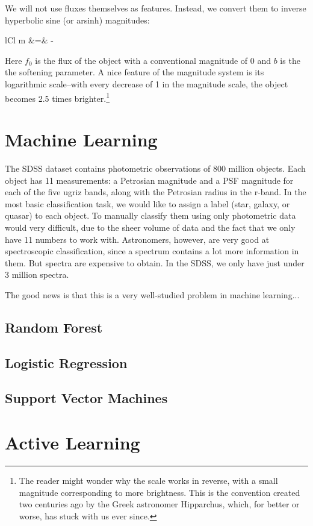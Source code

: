 We will not use fluxes themselves as features. Instead, we convert them to inverse
hyperbolic sine (or arsinh) magnitudes:
	\begin{IEEEeqnarray*}{lCl}
		m &=& - 
	\end{IEEEeqnarray*}
Here $f_0$ is the flux of the object with a conventional magnitude of 0 and $b$ is the
the softening parameter. A nice feature of the magnitude system is its logarithmic scale--with
every decrease of 1 in the magnitude scale, the object becomes 2.5 times brighter.\footnote{
	The reader might wonder why the scale works in reverse, with a small magnitude
	corresponding to more brightness. This is the convention created two centuries ago by
	the Greek astronomer Hipparchus, which, for better or worse, has stuck with us ever since.}



\section{Machine Learning}
\label{sec:machine}

The SDSS dataset contains photometric observations of 800 million objects. Each object
has 11 measurements: a Petrosian magnitude and a PSF magnitude for each of the five
ugriz bands, along with the Petrosian radius in the r-band. In the most basic
classification task, we would like to assign a label (star, galaxy, or quasar) to each object.
To manually classify them using only photometric data would very difficult, due to the 
sheer volume of data and the fact that we only have 11 numbers to work with. Astronomers, however,
are very good at spectroscopic classification, since a spectrum contains a lot more
information in them. But spectra are expensive to obtain. In the SDSS, we only have just under
3 million spectra.

The good news is that this is a very well-studied problem in machine learning...

\subsection{Random Forest}

\subsection{Logistic Regression}

\subsection{Support Vector Machines}




\section{Active Learning}
\label{sec:organisation}

